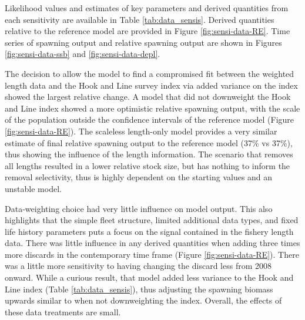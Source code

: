 \documentclass[11pt,
  english,
  a4paper,
]{article}
\begin{document}
\tagstructend


Likelihood values and estimates of key parameters and derived quantities from each sensitivity are available in Table \ref{tab:data_sensis}. Derived quantities relative to the reference model are provided in Figure \ref{fig:sensi-data-RE}. Time series of spawning output and relative spawning output are shown in Figures \ref{fig:sensi-data-ssb} and \ref{fig:sensi-data-depl}.

\leavevmode\tagmcend\tagstructend\par


The decision to allow the model to find a compromised fit between the weighted length data and the Hook and Line survey index via added variance on the index showed the largest relative change. A model that did not downweight the Hook and Line index showed a more optimistic relative spawning output, with the scale of the population outside the confidence intervals of the reference model (Figure \ref{fig:sensi-data-RE}). The scaleless length-only model provides a very similar estimate of final relative spawning output to the reference model (37\% vs 37\%), thus showing the influence of the length information. The scenario that removes all lengths resulted in a lower relative stock size, but has nothing to inform the removal selectivity, thus is highly dependent on the starting values and an unstable model.

\leavevmode\tagmcend\tagstructend\par


Data-weighting choice had very little influence on model output. This also highlights that the simple fleet structure, limited additional data types, and fixed life history parameters puts a focus on the signal contained in the fishery length data. There was little influence in any derived quantities when adding three times more discards in the contemporary time frame (Figure \ref{fig:sensi-data-RE}). There was a little more sensitivity to having changing the discard less from 2008 onward. While a curious result, that model added less variance to the Hook and Line index (Table \ref{tab:data_sensis}), thus adjusting the spawning biomass upwards similar to when not downweighting the index. Overall, the effects of these data treatments are small.
\end{document}
